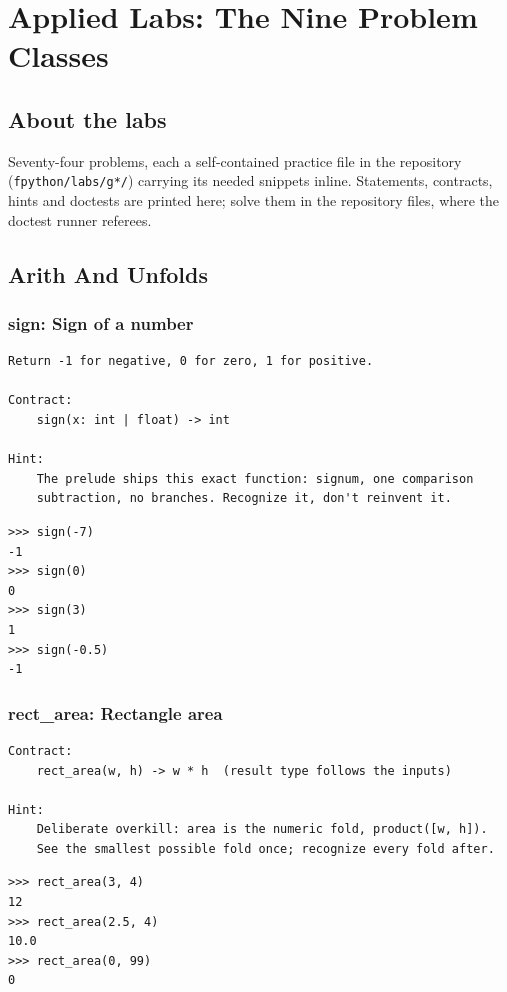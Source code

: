 \documentclass[10pt,letterpaper]{book}
\begin{document}
\part{Applied Labs: The Nine Problem Classes}
\chapter*{About the labs}
Seventy-four problems, each a self-contained practice file in the repository
(\texttt{fpython/labs/g*/}) carrying its needed snippets inline. Statements,
contracts, hints and doctests are printed here; solve them in the repository files, where the doctest runner referees.
\chapter{Arith And Unfolds}

\section{sign: Sign of a number}
\begin{lstlisting}[style=ex]
Return -1 for negative, 0 for zero, 1 for positive.

Contract:
    sign(x: int | float) -> int

Hint:
    The prelude ships this exact function: signum, one comparison
    subtraction, no branches. Recognize it, don't reinvent it.
\end{lstlisting}
\begin{lstlisting}[style=ex]
>>> sign(-7)
-1
>>> sign(0)
0
>>> sign(3)
1
>>> sign(-0.5)
-1
\end{lstlisting}

\section{rect\_area: Rectangle area}
\begin{lstlisting}[style=ex]
Contract:
    rect_area(w, h) -> w * h  (result type follows the inputs)

Hint:
    Deliberate overkill: area is the numeric fold, product([w, h]).
    See the smallest possible fold once; recognize every fold after.
\end{lstlisting}
\begin{lstlisting}[style=ex]
>>> rect_area(3, 4)
12
>>> rect_area(2.5, 4)
10.0
>>> rect_area(0, 99)
0
\end{lstlisting}
\end{document}
